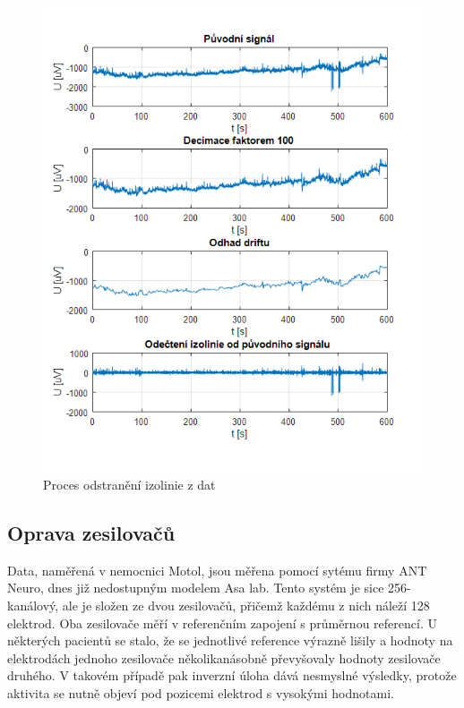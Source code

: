 \begin{figure}[!h]
\includegraphics[width=1.0\textwidth]{casti/implementace/izolinie/aplikace.png}
\caption{Proces odstranění izolinie z dat}
\end{figure}

\subsection{Oprava zesilovačů}
Data, naměřená v nemocnici Motol, jsou měřena pomocí sytému firmy ANT Neuro, dnes již nedostupným modelem Asa lab. Tento systém je sice 256-kanálový, ale je složen ze dvou zesilovačů, přičemž každému z nich náleží 128 elektrod. Oba zesilovače měří v referenčním zapojení s průměrnou referencí. U některých pacientů se stalo, že se jednotlivé reference výrazně lišily a hodnoty na elektrodách jednoho zesilovače několikanásobně převyšovaly hodnoty zesilovače druhého. V takovém případě pak inverzní úloha dává nesmyslné výsledky, protože aktivita se nutně objeví pod pozicemi elektrod s vysokými hodnotami.

